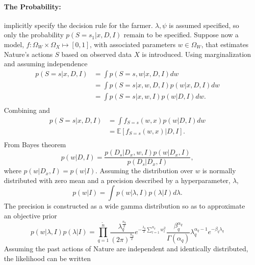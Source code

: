\begin{example}
	\paragraph{The Probability:}  implicitly specify the decision rule for the farmer. $\lambda,\psi$ is assumed specified, so only the probability $p(S= s_1|x,D,I)$ remain to be specified. Suppose now a model, $f: \Omega_W\times \Omega_X\mapsto[0,1]$, with associated parameters $w\in \Omega_W$, that estimates Nature's actions $S$ based on observed data $X$ is introduced. Using marginalization and assuming independence 
	\begin{equation}
		\begin{split}
			p(S= s|x,D,I) &= \int p(S= s,w|x,D,I) dw \\
			& = \int p(S= s|x,w,D,I)  p(w|x,D,I)dw \\
			& = \int p(S= s|x,w,I)  p(w|D,I)dw. \\
		\end{split}
		\label{eq:q5}
	\end{equation}
	Combining  and 
	\begin{equation}
		\begin{split}
			p(S= s|x,D,I) & = \int f_{S = s}(w,x)  p(w|D,I)dw \\
			& = \mathbb{E}[f_{S = s}(w,x)|D,I].\\
		\end{split}
	\end{equation}
	From Bayes theorem 
	\begin{equation}
		p(w|D,I) =\frac{p(D_s|D_x,w,I)p(w|D_x,I)}{p(D_s|D_x,I)},
	\end{equation}
	where $p(w|D_x,I) = p(w|I)$. Assuming the distribution over $w$ is normally distributed with zero mean and a precision described by a hyperparameter, $\lambda$, 
	\begin{equation}
		p(w|I) = \int p(w|\lambda,I)p(\lambda|I)d\lambda.
		\label{eq:lambda}
	\end{equation}
	The precision is constructed as a wide gamma distribution so as to approximate an objective prior
	\begin{equation}
		p(w|\lambda,I)p(\lambda|I)
		= \prod_{q=1}^{\tilde{n}} \frac{\lambda_q^\frac{n_q}{2}}{(2\pi)^\frac{n_q}{2}}e^{-\frac{\lambda_q}{2}\sum_{l=1}^{n_q}w_l^2}\frac{\beta_q^{\alpha_q}}{\Gamma(\alpha_q)}\lambda_q^{\alpha_q-1}e^{-\beta_q \lambda_q}
		\label{eq:prior}
	\end{equation}
	Assuming the past actions of Nature are independent and identically distributed, the likelihood can be written 

\end{example}
